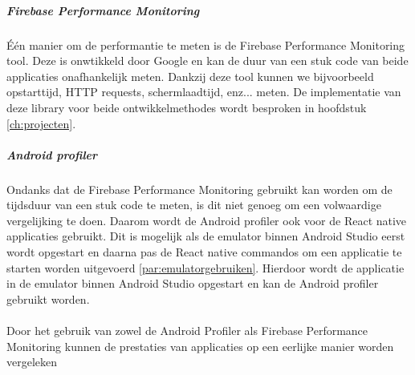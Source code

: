 \subparagraph{Firebase Performance Monitoring}
Één manier om de performantie te meten is de Firebase Performance Monitoring tool. 
Deze is onwtikkeld door Google en kan de duur van een stuk code van beide applicaties 
onafhankelijk meten. Dankzij deze tool kunnen we bijvoorbeeld opstarttijd, HTTP requests, 
schermlaadtijd, enz... meten. De implementatie van deze library voor beide ontwikkelmethodes wordt besproken 
in hoofdstuk \ref{ch:projecten}.

\subparagraph{Android profiler}
Ondanks dat de Firebase Performance Monitoring gebruikt kan worden om de tijdsduur 
van een stuk code te meten, is dit niet genoeg om een volwaardige vergelijking te 
doen. Daarom wordt de Android profiler ook voor de React native applicaties 
gebruikt. Dit is mogelijk als de emulator binnen Android Studio eerst wordt opgestart 
en daarna pas de React native commandos om een applicatie te starten worden uitgevoerd 
\ref{par:emulatorgebruiken}. Hierdoor wordt de applicatie in de emulator 
binnen Android Studio opgestart en kan de Android profiler gebruikt worden. 
\\\\
Door het gebruik van zowel de Android Profiler als Firebase Performance Monitoring 
kunnen de prestaties van applicaties op een eerlijke manier worden vergeleken
